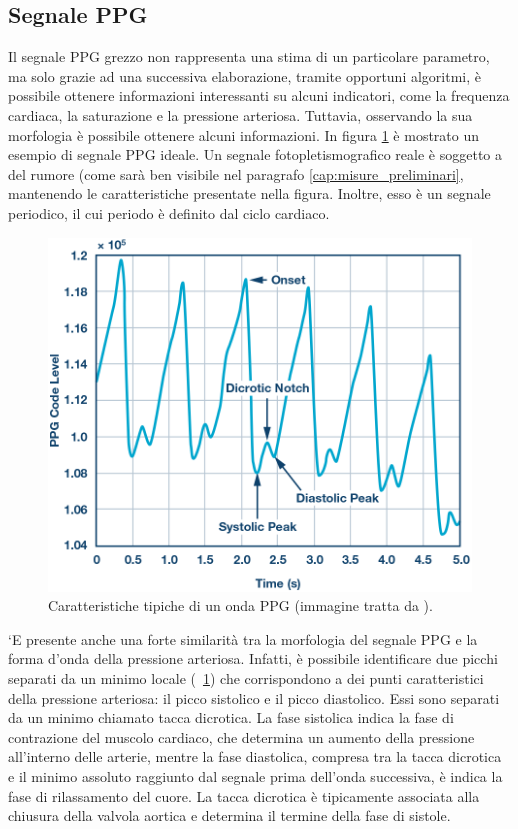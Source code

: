 \subsection{Segnale PPG}
Il segnale PPG grezzo non rappresenta una stima di un particolare parametro, ma solo grazie ad una successiva elaborazione, tramite opportuni algoritmi, è possibile ottenere informazioni interessanti su alcuni indicatori, come la frequenza cardiaca, la saturazione e la pressione arteriosa.
Tuttavia, osservando la sua morfologia è possibile ottenere alcuni informazioni\cite{Foroozan2018}. In figura \ref{fig:Descrizione_Segnale_PPG} è mostrato un esempio di segnale PPG ideale. Un segnale fotopletismografico reale è soggetto a del rumore (come sarà ben visibile nel paragrafo \ref{cap:misure_preliminari}, mantenendo le caratteristiche presentate nella figura. Inoltre, esso è un segnale periodico, il cui periodo è definito dal ciclo cardiaco.
\begin{figure}[h]
	\centering
	\includegraphics[width=0.7\linewidth]{ImageFiles/Misure Preliminari/descrizione_segnale_ppg}
	\caption{Caratteristiche tipiche di un onda PPG (immagine tratta da \cite{Ppgsignal}).}
	\label{fig:Descrizione_Segnale_PPG}
\end{figure}
`E presente anche una forte similarità tra la morfologia del segnale PPG e la forma d'onda della pressione arteriosa. Infatti, è possibile identificare due picchi separati da un minimo locale (\Fig~\ref{fig:Descrizione_Segnale_PPG}) che corrispondono a dei punti caratteristici della pressione arteriosa: il picco sistolico e il picco diastolico. Essi sono separati da un minimo chiamato tacca dicrotica. La fase sistolica indica la fase di contrazione del muscolo cardiaco, che determina un aumento della pressione all'interno delle arterie, mentre la fase diastolica, compresa tra la tacca dicrotica e il minimo assoluto raggiunto dal segnale prima dell'onda successiva, è indica la fase di rilassamento del cuore\cite{Singh2017}. La tacca dicrotica è tipicamente associata alla chiusura della valvola aortica e determina il termine della fase di sistole\cite{Gamrah2020}.

